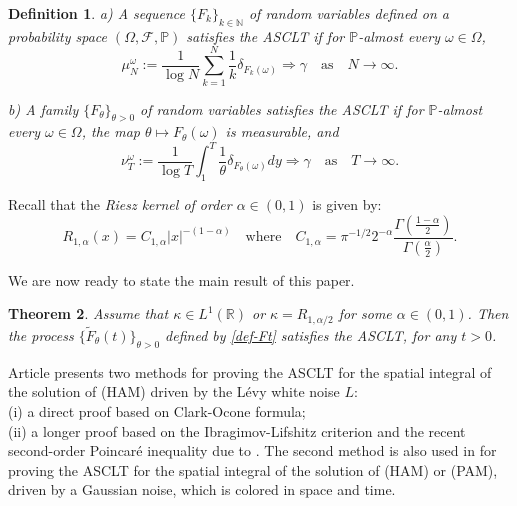 \documentclass[12pt]{article}
\newtheorem{theorem}{Theorem}[section]
\newtheorem{definition}[theorem]{Definition}
\def\cF{\mathcal{F}}
\def\bN{\mathbb{N}}
\def\bP{\mathbb{P}}
\def\bR{\mathbb{R}}
\def\k{\kappa}
\begin{document}
\begin{definition}
{\rm
a) A sequence $\{ F_k\}_{k \in \bN}$ of random variables defined on a probability space $(\Omega,\cF,\bP)$ {\em satisfies
the ASCLT} if for $\bP$-almost every $\omega \in \Omega$,
\[
\mu_N^{\omega}:= \frac{1}{\log N}\sum_{k=1}^{N}\frac{1}{k}\delta_{F_k(\omega)} \Longrightarrow \gamma \quad \mbox{as}  \quad N \to \infty.
\]



b) A family  $\{ F_{\theta}\}_{\theta >0}$ of random variables {\em satisfies
the  ASCLT} if for $\bP$-almost every
 $\omega\in\Omega$, the map $\theta \mapsto F_{\theta}(\omega)$ is  measurable, and
\[
\nu_T^{\omega}:= 
\frac{1}{\log T}\int_1^T  \frac{1}{\theta}\delta_{F_{\theta}(\omega)}   dy
\Longrightarrow \gamma \quad \mbox{as}  \quad T \to \infty.
\]
}
\end{definition}

Recall that the {\em Riesz kernel of order $\alpha \in (0,1)$} is given by:
\[
R_{1,\alpha}(x)=C_{1,\alpha}|x|^{-(1-\alpha)} \quad \mbox{where} \quad C_{1,\alpha}=\pi^{-1/2}2^{-\alpha}\frac{\Gamma(\frac{1-\alpha}{2})}{\Gamma(\frac{\alpha}{2})}.
\]




We are now ready to state the main result of this paper.

\begin{theorem}
\label{main}
Assume that $\kappa \in L^1(\bR)$ or $\kappa=R_{1,\alpha/2}$ for some $\alpha \in (0,1)$. Then the process
$\{\widetilde{F}_{\theta}(t)\}_{\theta >0}$ defined by \eqref{def-Ft} satisfies the ASCLT, for any $t>0$.
\end{theorem}

Article \cite{BXZ} presents two methods for proving the ASCLT for
 the spatial integral of the solution of (HAM) driven by the L\'evy white noise $L$: \\
 (i) a direct proof based on Clark-Ocone formula; \\
 (ii) a longer proof based on the Ibragimov-Lifshitz criterion and the recent second-order Poincar\'e inequality due to \cite{trauthwein25}. 
 The second method is also used in \cite{xia-zheng25} for proving the ASCLT for the spatial integral of the solution of (HAM) or (PAM), driven by a Gaussian noise, which is colored in space and time. 
 
\end{document}
